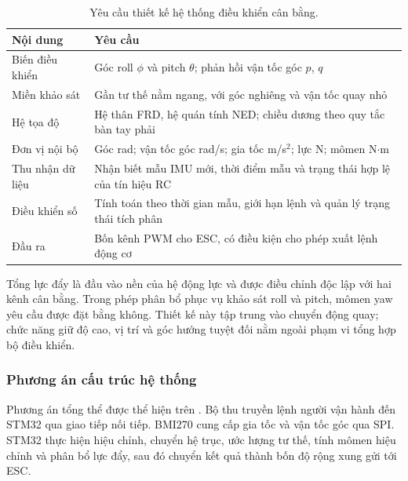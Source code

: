 \begin{table}[htbp]
	\centering
	\caption{Yêu cầu thiết kế hệ thống điều khiển cân bằng.}
	\label{tab:design-requirements}
	\begin{tabularx}{\linewidth}{|C{3.1cm}|Y|}
		\hline
		\textbf{Nội dung} & \textbf{Yêu cầu}                                                            \\
		\hline
		Biến điều khiển   & Góc roll $\phi$ và pitch $\theta$; phản hồi vận tốc góc $p$, $q$            \\
		\hline
		Miền khảo sát     & Gần tư thế nằm ngang, với góc nghiêng và vận tốc quay nhỏ                   \\
		\hline
		Hệ tọa độ         & Hệ thân FRD, hệ quán tính NED; chiều dương theo quy tắc bàn tay phải        \\
		\hline
		Đơn vị nội bộ     & Góc rad; vận tốc góc rad/s; gia tốc m/s$^2$; lực N; mômen N$\cdot$m         \\
		\hline
		Thu nhận dữ liệu  & Nhận biết mẫu IMU mới, thời điểm mẫu và trạng thái hợp lệ của tín hiệu RC   \\
		\hline
		Điều khiển số     & Tính toán theo thời gian mẫu, giới hạn lệnh và quản lý trạng thái tích phân \\
		\hline
		Đầu ra            & Bốn kênh PWM cho ESC, có điều kiện cho phép xuất lệnh động cơ               \\
		\hline
	\end{tabularx}
\end{table}

Tổng lực đẩy là đầu vào nền của hệ động lực và được điều chỉnh độc lập với hai kênh cân bằng. Trong phép phân bổ phục vụ khảo sát roll và pitch, mômen yaw yêu cầu được đặt bằng không. Thiết kế này tập trung vào chuyển động quay; chức năng giữ độ cao, vị trí và góc hướng tuyệt đối nằm ngoài phạm vi tổng hợp bộ điều khiển.

\subsubsection{Phương án cấu trúc hệ thống}

Phương án tổng thể được thể hiện trên . Bộ thu truyền lệnh người vận hành đến STM32 qua giao tiếp nối tiếp. BMI270 cung cấp gia tốc và vận tốc góc qua SPI. STM32 thực hiện hiệu chỉnh, chuyển hệ trục, ước lượng tư thế, tính mômen hiệu chỉnh và phân bổ lực đẩy, sau đó chuyển kết quả thành bốn độ rộng xung gửi tới ESC.

